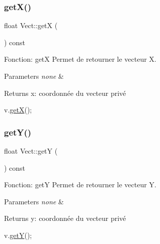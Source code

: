 \subsubsection{\texorpdfstring{get\+X()}{getX()}}
{\footnotesize\ttfamily float Vect\+::getX (\begin{DoxyParamCaption}{ }\end{DoxyParamCaption}) const}



Fonction\+: getX Permet de retourner le vecteur X. 


\begin{DoxyParams}{Parameters}
{\em none} & \\
\hline
\end{DoxyParams}
\begin{DoxyReturn}{Returns}
x\+: coordonnée du vecteur privé 
\begin{DoxyCode}
v.\hyperlink{classVect_a8925192fe8666b52b2385ff006ab3213}{getX}();
\end{DoxyCode}
 
\end{DoxyReturn}
\mbox{\label{classVect_a2e44111683aae147cd053ac6002f5992}} 
\subsubsection{\texorpdfstring{get\+Y()}{getY()}}
{\footnotesize\ttfamily float Vect\+::getY (\begin{DoxyParamCaption}{ }\end{DoxyParamCaption}) const}



Fonction\+: getY Permet de retourner le vecteur Y. 


\begin{DoxyParams}{Parameters}
{\em none} & \\
\hline
\end{DoxyParams}
\begin{DoxyReturn}{Returns}
y\+: coordonnée du vecteur privé 
\begin{DoxyCode}
v.\hyperlink{classVect_a2e44111683aae147cd053ac6002f5992}{getY}();
\end{DoxyCode}
 
\end{DoxyReturn}
\mbox{\label{classVect_aa61c71b79a4d2f2cda092648a7268c4f}} 
